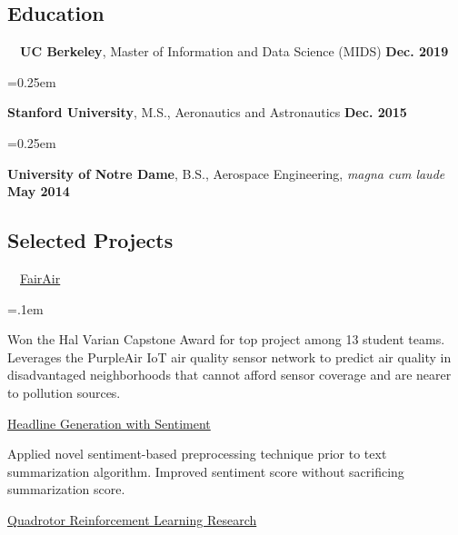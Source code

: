 \documentclass[10pt,letterpaper]{article}
\begin{document}
\begin{paracol}{2}
\setlength{\columnsep}{2em}

\begin{leftcolumn}

\subsection*{Education}

    \quad \ \ \textbf{UC Berkeley}, Master of Information and Data Science (MIDS) \textbf{\hfill Dec. 2019}

    \parskip=0.25em

    \textbf{Stanford University}, M.S., Aeronautics and Astronautics \textbf{\hfill Dec. 2015}

    \parskip=0.25em

    \textbf{University of Notre Dame}, B.S., Aerospace Engineering, \emph{magna cum laude} \textbf{\hfill May 2014}

\subsection*{Selected Projects}

    \quad \ \ \href{https://www.ischool.berkeley.edu/projects/2019/fairair-filling-gaps-air-pollution-monitoring}{FairAir}

    \parskip=.1em

        \begin{adjustwidth}{2.5em}{}
        Won the Hal Varian Capstone Award for top project among 13 student teams. Leverages the PurpleAir IoT air quality sensor network to predict air quality in disadvantaged neighborhoods that cannot afford sensor coverage and are nearer to pollution sources.
        \end{adjustwidth}

    \href{https://github.com/mpaluta/headline_generation/blob/master/Headline_Generation_Arnoldy_Paluta.pdf}{Headline Generation with Sentiment}

        \begin{adjustwidth}{2.5em}{}
        Applied novel sentiment-based preprocessing technique prior to text summarization algorithm. Improved sentiment score without sacrificing summarization score.
        \end{adjustwidth}

    \href{https://github.com/mpaluta/Quadrotor-PILCO/blob/QuadrotorPILCO/Quadrotor\%20Reinforcement\%20Learning\%20Research.pdf}{Quadrotor Reinforcement Learning Research}


\end{leftcolumn}
\end{paracol}
\end{document}
